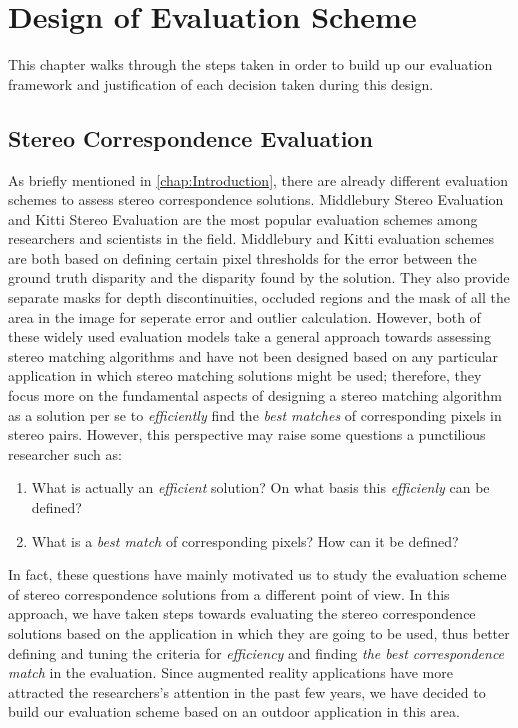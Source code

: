 \chapter{Design of Evaluation Scheme}
\label{chap:System}

This chapter walks through the steps taken in order to build up our evaluation framework and justification of each decision taken during this design.

\section{Stereo Correspondence Evaluation}

As briefly mentioned in \ref{chap:Introduction}, there are already different evaluation schemes to assess stereo correspondence solutions. Middlebury Stereo Evaluation \cite{mideval} and 
Kitti Stereo Evaluation \cite{kitti} are the most popular evaluation schemes among researchers and scientists in the field. 
Middlebury and Kitti evaluation schemes are both based on defining certain pixel thresholds for the error between the ground truth disparity and the disparity found by the solution. 
They also provide separate masks for depth discontinuities, occluded regions and the mask of all the area in the image for seperate error and outlier calculation.
However, both of these widely used evaluation models take a general approach towards assessing stereo matching algorithms and have not been designed based on any particular application in which 
stereo matching solutions might be used; therefore, they focus more on the fundamental aspects of designing a stereo matching algorithm as a solution per se to \textit{efficiently}
find the \textit{best matches} of corresponding pixels in stereo pairs. 
However, this perspective may raise some questions a punctilious researcher such as:

\begin{enumerate}
\item What is actually an \textit{efficient} solution? On what basis this \textit{efficienly} can be defined?
\item What is a \textit{best match} of corresponding pixels? How can it be defined?
\end{enumerate}

In fact, these questions have mainly motivated us to study the evaluation scheme of stereo correspondence solutions from a different point of view. 
In this approach, we have taken steps towards evaluating the stereo correspondence solutions based on the application in which they are going to be used, 
thus better defining and tuning the criteria for \textit{efficiency} and 
finding \textit{the best correspondence match} in the evaluation. Since augmented reality applications have more attracted the researchers's attention in the past few years, 
we have decided to build our evaluation scheme based on an outdoor application in this area.

